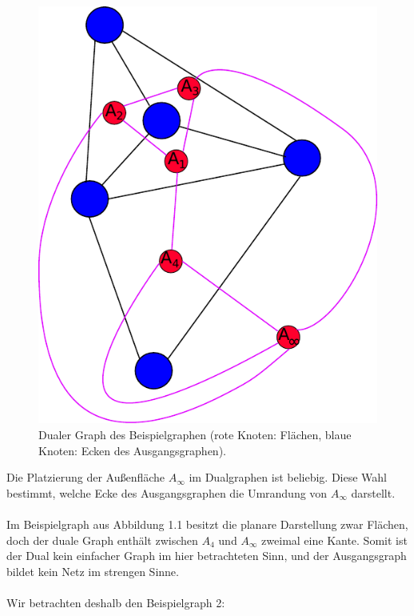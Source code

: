 \documentclass[11pt,a4paper,leqno]{report}
\numberwithin{equation}{chapter}
\begin{document}
\begin{figure}[H]
	\begin{center}
		\includegraphics[scale=0.4]{Abbildungen/graph_1_dual.pdf}
		\caption{Dualer Graph des Beispielgraphen (rote Knoten: Flächen, blaue Knoten: Ecken des Ausgangsgraphen).}
	\end{center}
\end{figure}
\noindent
Die Platzierung der Außenfläche $A_\infty$ im Dualgraphen ist beliebig. Diese Wahl bestimmt, welche Ecke des Ausgangsgraphen die Umrandung von $A_\infty$ darstellt.\\
\\
Im Beispielgraph aus Abbildung 1.1 besitzt die planare Darstellung zwar Flächen, doch der duale Graph enthält zwischen $A_4$ und $A_\infty$ zweimal eine Kante. Somit ist der Dual kein einfacher Graph im hier betrachteten Sinn, und der Ausgangsgraph bildet kein Netz im strengen Sinne.\\
\\
Wir betrachten deshalb den Beispielgraph 2:
\end{document}
